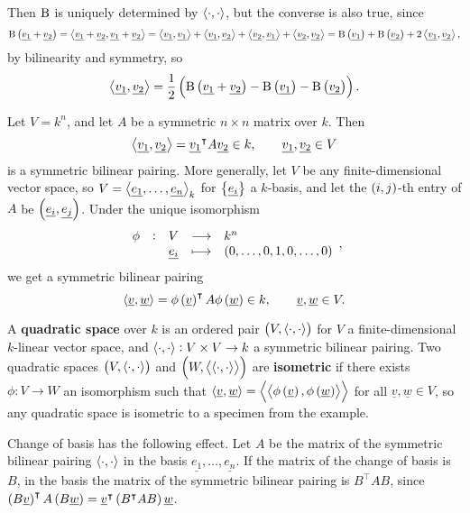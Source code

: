 \begin{remark}
Then $ \mathrm{B} $ is uniquely determined by $ \left\langle \cdot, \cdot \right\rangle $, but the converse is also true, since
$$ \B\br{\underline{v_1} + \underline{v_2}} = \abr{\underline{v_1} + \underline{v_2}, \underline{v_1} + \underline{v_2}} = \abr{\underline{v_1}, \underline{v_1}} + \abr{\underline{v_1}, \underline{v_2}} + \abr{\underline{v_2}, \underline{v_1}} + \abr{\underline{v_2}, \underline{v_2}} = \B\br{\underline{v_1}} + \B\br{\underline{v_2}} + 2\abr{\underline{v_1}, \underline{v_2}}, $$
by bilinearity and symmetry, so
$$ \abr{\underline{v_1}, \underline{v_2}} = \dfrac{1}{2}\br{\B\br{\underline{v_1} + \underline{v_2}} - \B\br{\underline{v_1}} - \B\br{\underline{v_2}}}. $$
\end{remark}

\begin{example}
Let $ V = k^n $, and let $ A $ be a symmetric $ n \times n $ matrix over $ k $. Then
$$ \left\langle \underline{v_1}, \underline{v_2} \right\rangle = \underline{v_1}^\intercal A\underline{v_2} \in k, \qquad \underline{v_1}, \underline{v_2} \in V $$
is a symmetric bilinear pairing. More generally, let $ V $ be any finite-dimensional vector space, so $ V = \left\langle \underline{e_1}, \dots, \underline{e_n} \right\rangle_k $ for $ \cbr{\underline{e_i}} $ a $ k $-basis, and let the $ \br{i, j} $-th entry of $ A $ be $ \br{\underline{e_i}, \underline{e_j}} $. Under the unique isomorphism
$$ \function[\phi]{V}{k^n}{\underline{e_i}}{\br{0, \dots, 0, 1, 0, \dots, 0}}, $$
we get a symmetric bilinear pairing
$$ \abr{\underline{v}, \underline{w}} = \phi\br{\underline{v}}^\intercal A\phi\br{\underline{w}} \in k, \qquad \underline{v}, \underline{w} \in V. $$
\end{example}

\begin{definition}
A \textbf{quadratic space} over $ k $ is an ordered pair $ \br{V, \abr{\cdot, \cdot}} $ for $ V $ a finite-dimensional $ k $-linear vector space, and $ \left\langle \cdot, \cdot \right\rangle : V \times V \to k $ a symmetric bilinear pairing. Two quadratic spaces $ \br{V, \abr{\cdot, \cdot}} $ and $ \br{W, \abr{\abr{\cdot, \cdot}}} $ are \textbf{isometric} if there exists $ \phi : V \to W $ an isomorphism such that $ \abr{\underline{v}, \underline{w}} = \abr{\abr{\phi\br{\underline{v}}, \phi\br{\underline{w}}}} $ for all $ \underline{v}, \underline{w} \in V $, so any quadratic space is isometric to a specimen from the example.
\end{definition}

\begin{remark}
Change of basis has the following effect. Let $ A $ be the matrix of the symmetric bilinear pairing $ \left\langle \cdot, \cdot \right\rangle $ in the basis $ \underline{e_1}, \dots, \underline{e_n} $. If the matrix of the change of basis is $ B $, in the basis the matrix of the symmetric bilinear pairing is $ B^\intercal AB $, since $ \br{B\underline{v}}^\intercal A\br{B\underline{w}} = \underline{v}^\intercal \br{B^\intercal AB}\underline{w} $.
\end{remark}

